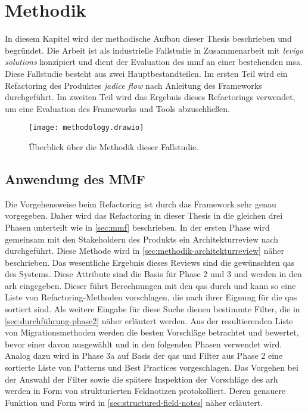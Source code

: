 \chapter{Methodik}
\label{chap:methodik}

In diesem Kapitel wird der methodische Aufbau dieser Thesis beschrieben und begründet.
Die Arbeit ist als industrielle Fallstudie in Zusammenarbeit mit \emph{levigo solutions} konzipiert und dient der Evaluation des \gls{mmf} an einer bestehenden \acrlong{msa}.
Diese Fallstudie besteht aus zwei Hauptbestandteilen.
Im ersten Teil wird ein Refactoring des Produktes \emph{jadice flow} nach Anleitung des Frameworks durchgeführt.
Im zweiten Teil wird das Ergebnis dieses Refactorings verwendet, um eine Evaluation des Frameworks und Tools abzuschließen.

\begin{figure}[!ht]
	\centering
	\texttt{[image: methodology.drawio]}
	\caption[Überblick über die Methodik dieser Fallstudie]{
		Überblick über die Methodik dieser Fallstudie.
	}
	\label{fig:methodology}
\end{figure}

\section{Anwendung des MMF}

Die Vorgehensweise beim Refactoring ist durch das Framework sehr genau vorgegeben.
Daher wird das Refactoring in dieser Thesis in die gleichen drei Phasen unterteilt wie in \cref{sec:mmf} beschrieben.
In der ersten Phase wird gemeinsam mit den Stakeholdern des Produkts ein Architekturreview nach  durchgeführt.
Diese Methode wird in \cref{sec:methodik-architekturreview} näher beschrieben.
Das wesentliche Ergebnis dieses Reviews sind die gewünschten \glspl{qa} des Systems.
Diese Attribute sind die Basis für Phase 2 und 3 und werden in den \gls{arh} eingegeben.
Dieser führt Berechnungen mit den \glspl{qa} durch und kann so eine Liste von Refactoring-Methoden vorschlagen, die nach ihrer Eignung für die \glspl{qa} sortiert sind.
Als weitere Eingabe für diese Suche dienen bestimmte Filter, die in \cref{sec:durchführung-phase2} näher erläutert werden.
Aus der resultierenden Liste von Migrationsmethoden werden die besten Vorschläge betrachtet und bewertet, bevor einer davon ausgewählt und in den folgenden Phasen verwendet wird.
Analog dazu wird in Phase 3a auf Basis der \glspl{qa} und Filter aus Phase 2 eine sortierte Liste von Patterns und Best Practices vorgeschlagen.
Das Vorgehen bei der Auswahl der Filter sowie die spätere Inspektion der Vorschläge des \gls{arh} werden in Form von strukturierten Feldnotizen protokolliert.
Deren genauere Funktion und Form wird in \cref{sec:structured-field-notes} näher erläutert.

